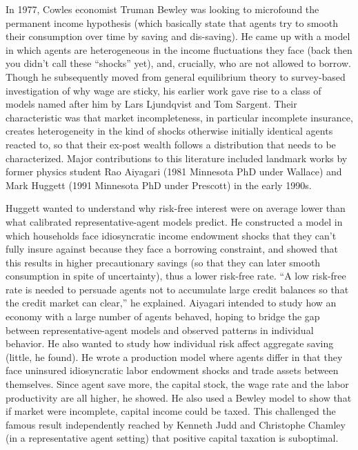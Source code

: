 \documentclass[10pt,math=newtx,citestyle=gb7714-2015,bibstyle=gb7714-2015]{elegantbook}
\begin{document}
{	In 1977, Cowles economist Truman Bewley was looking to microfound the permanent income hypothesis (which basically state that agents try to smooth their consumption over time by saving and dis-saving). He came up with a model in which agents are heterogeneous in the income fluctuations they face (back then you didn’t call these “shocks” yet), and, crucially, who are not allowed to borrow. Though he subsequently moved from general equilibrium theory to survey-based investigation of why wage are sticky, his earlier work gave rise to a class of models named after him by Lars Ljundqvist and Tom Sargent. Their characteristic was that market incompleteness, in particular incomplete insurance, creates heterogeneity in the kind of shocks otherwise initially identical agents reacted to, so that their ex-post wealth follows a distribution that needs to be characterized. Major contributions to this literature included landmark works by former physics student Rao Aiyagari (1981 Minnesota PhD under Wallace) and Mark Huggett (1991 Minnesota PhD under Prescott) in the early 1990s.
	
	Huggett wanted to understand why risk-free interest were on average lower than what calibrated representative-agent models predict. He constructed a model in which households face idiosyncratic income endowment shocks that they can’t fully insure against because they face a borrowing constraint, and showed that this results in higher precautionary savings (so that they can later smooth consumption in spite of uncertainty), thus a lower risk-free rate. “A low risk-free rate is needed to persuade agents not to accumulate large credit balances so that the credit market can clear,” he explained. Aiyagari intended to study how an economy with a large number of agents behaved, hoping to bridge the gap between representative-agent models and observed patterns in individual behavior. He also wanted to study how individual risk affect aggregate saving (little, he found). He wrote a production model where agents differ in that they face uninsured idiosyncratic labor endowment shocks and trade assets between themselves. Since agent save more, the capital stock, the wage rate and the labor productivity are all higher, he showed.  He also used a Bewley model to show that if market were incomplete, capital income could be taxed. This challenged the famous result independently reached by Kenneth Judd and Christophe Chamley (in a representative agent setting) that positive capital taxation is suboptimal.
	
}
\end{document}
